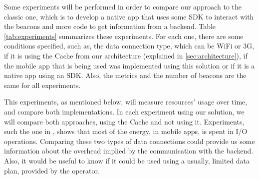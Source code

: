Some experiments will be performed in order to compare
our approach to the classic one, which is to develop a
native app that uses some SDK to interact with the beacons
and more code to get information from a backend.
Table \ref{tab:experiments} summarizes these experiments.
For each one, there are some conditions specified, such as,
the data connection type, which can be WiFi or 3G, if
it is using the Cache from our architecture (explained in 
\ref{sec:architecture}), if the mobile app that is being
used was implemented using this solution or if it is
a native app using an SDK. 
Also, the metrics and the number of beacons
are the same for all experiments.



This experiments, as mentioned below, 
will measure resources' usage over time, 
and compare both implementations. In each
experiment using our solution, we will
compare both approaches, using the Cache
and not using it.
Experiments, such the one
in \cite{Pathak2012}, shows that most of the energy, 
in mobile apps,
is spent in I/O operations.
Comparing these
two types of data connections could provide us
some information about the
overhead implied by the communication with
the backend. Also, it would be useful to
know if it could be used using
a usually, limited data plan, provided by
the operator.

